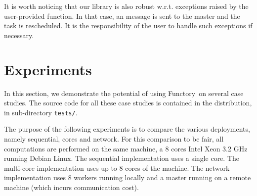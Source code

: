 \documentclass{llncs}
\newcommand{\functory}{\textsf{Functory}}
\begin{document}
It is worth noticing that our library is also robust w.r.t. exceptions
raised by the user-provided  function. In that case, an
 message is sent to the master and the task is
rescheduled. It is the responsibility of the user to handle such
exceptions if necessary.


\section{Experiments}\label{sec:experiments}

In this section, we demonstrate the potential of using \functory\ on
several case studies.
The source code for all these case studies is contained in the
distribution, in sub-directory \texttt{tests/}.

The purpose of the following experiments is to compare the various
deployments, namely sequential, cores and network.
For this comparison to be fair, all
computations are performed on the same machine, a 8 cores Intel Xeon
3.2 GHz running Debian Linux. The sequential implementation uses a
single core. The multi-core implementation uses up to 8 cores of
the machine. The network implementation uses 8 workers running locally and
a master running on a remote machine (which incurs communication cost).
\end{document}
